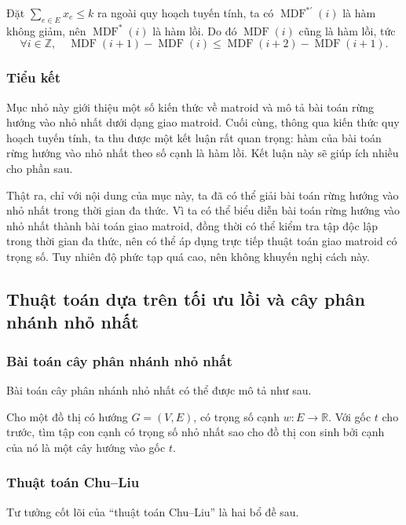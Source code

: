 \documentclass[11pt]{article}
\begin{document}
Đặt \(\sum_{e\in E}x_e\le k\) ra ngoài quy hoạch tuyến tính, ta có
\(\operatorname{MDF}^{*\prime}(i)\) là hàm không giảm, nên
\(\operatorname{MDF}^*(i)\) là hàm lồi. Do đó \(\operatorname{MDF}(i)\) cũng là
hàm lồi, tức
\[
\forall i\in\mathbb{Z},\quad
\operatorname{MDF}(i+1)-\operatorname{MDF}(i)
\le
\operatorname{MDF}(i+2)-\operatorname{MDF}(i+1).
\]

\subsubsection{Tiểu kết}

Mục nhỏ này giới thiệu một số kiến thức về matroid và mô tả bài toán rừng hướng
vào nhỏ nhất dưới dạng giao matroid. Cuối cùng, thông qua kiến thức quy hoạch
tuyến tính, ta thu được một kết luận rất quan trọng: hàm của bài toán rừng hướng
vào nhỏ nhất theo số cạnh là hàm lồi. Kết luận này sẽ giúp ích nhiều cho phần
sau.

Thật ra, chỉ với nội dung của mục này, ta đã có thể giải bài toán rừng hướng
vào nhỏ nhất trong thời gian đa thức. Vì ta có thể biểu diễn bài toán rừng hướng
vào nhỏ nhất thành bài toán giao matroid, đồng thời có thể kiểm tra tập độc lập
trong thời gian đa thức, nên có thể áp dụng trực tiếp thuật toán giao matroid có
trọng số. Tuy nhiên độ phức tạp quá cao, nên không khuyến nghị cách này.

\subsection{Thuật toán dựa trên tối ưu lồi và cây phân nhánh nhỏ nhất}

\subsubsection{Bài toán cây phân nhánh nhỏ nhất}

Bài toán cây phân nhánh nhỏ nhất có thể được mô tả như sau.

Cho một đồ thị có hướng \(G=(V,E)\), có trọng số cạnh \(w:E\to\mathbb{R}\). Với
gốc \(t\) cho trước, tìm tập con cạnh có trọng số nhỏ nhất sao cho đồ thị con
sinh bởi cạnh của nó là một cây hướng vào gốc \(t\).

\subsubsection{Thuật toán Chu--Liu}

Tư tưởng cốt lõi của ``thuật toán Chu--Liu'' là hai bổ đề sau.
\end{document}
